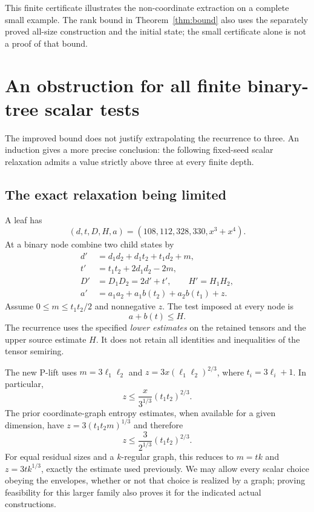 \documentclass[11pt]{article}
\theoremstyle{definition}\newtheorem{definition}[theorem]{Definition}
\theoremstyle{remark}\newtheorem{remark}[theorem]{Remark}
\begin{document}
This finite certificate illustrates the non-coordinate extraction on a complete small example. The rank bound in Theorem~\ref{thm:bound} also uses the separately proved all-size construction and the initial state; the small certificate alone is not a proof of that bound.

\section{An obstruction for all finite binary-tree scalar tests}\label{sec:barrier}

The improved bound does not justify extrapolating the recurrence to three. An induction gives a more precise conclusion: the following fixed-seed scalar relaxation admits a value strictly above three at every finite depth.

\subsection{The exact relaxation being limited}

A leaf has
\[
 (d,t,D,H,a)=(108,112,328,330,x^3+x^4).
\]
At a binary node combine two child states by
\begin{align}
 d'&=d_1d_2+d_1t_2+t_1d_2+m,\label{eq:relax-d}\\
 t'&=t_1t_2+2d_1d_2-2m,\label{eq:relax-t}\\
 D'&=D_1D_2=2d'+t',\qquad H'=H_1H_2,\label{eq:relax-D}\\
 a'&=a_1a_2+a_1b(t_2)+a_2b(t_1)+z.\label{eq:relax-a}
\end{align}
Assume $0\leq m\leq t_1t_2/2$ and nonnegative $z$. The test imposed at every node is
\begin{equation}\label{eq:node-test}
 a+b(t)\leq H.
\end{equation}
The recurrence uses the specified \emph{lower estimates} on the retained tensors and the upper source estimate $H$. It does not retain all identities and inequalities of the tensor semiring.

The new P-lift uses $m=3\ell_1\ell_2$ and $z=3x(\ell_1\ell_2)^{2/3}$, where $t_i=3\ell_i+1$. In particular,
\begin{equation}\label{eq:new-z-envelope}
 z\leq \frac{x}{3^{1/3}}(t_1t_2)^{2/3}.
\end{equation}
The prior coordinate-graph entropy estimates, when available for a given dimension, have $z=3(t_1t_2m)^{1/3}$ and therefore
\begin{equation}\label{eq:old-z-envelope}
 z\leq\frac{3}{2^{1/3}}(t_1t_2)^{2/3}.
\end{equation}
For equal residual sizes and a $k$-regular graph, this reduces to $m=tk$ and $z=3tk^{1/3}$, exactly the estimate used previously. We may allow every scalar choice obeying the envelopes, whether or not that choice is realized by a graph; proving feasibility for this larger family also proves it for the indicated actual constructions.
\end{document}
